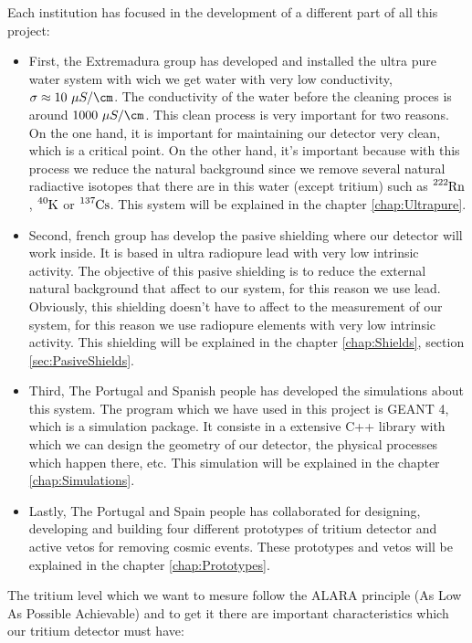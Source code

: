Each institution has focused in the development of a different part of all this project:
\begin{itemize}
\item{} First, the Extremadura group has developed and installed the ultra pure water system with wich we get water with very low conductivity, $\sigma \approx 10 ~\mu S / \cm$. The conductivity of the water before the cleaning proces is around $ 1000 ~\mu S / \cm$. This clean process is very important for two reasons. On the one hand, it is important for maintaining our detector very clean, which is a critical point. On the other hand, it's important because with this process we reduce the natural background since we remove several natural radiactive isotopes that there are in this water (except tritium) such as $\ce{^{222}Rn}$, $\ce{^{40}K}$ or $\ce{^{137}Cs}$. This system will be explained in the chapter \ref{chap:Ultrapure}.

\item{} Second, french group has develop the pasive shielding where our detector will work inside. It is based in ultra radiopure lead with very low intrinsic activity. The objective of this pasive shielding is to reduce the external natural background that affect to our system, for this reason we use lead. Obviously, this shielding doesn't have to affect to the measurement of our system, for this reason we use radiopure elements with very low intrinsic activity. This shielding will be explained in the chapter \ref{chap:Shields}, section \ref{sec:PasiveShields}.

\item{} Third, The Portugal and Spanish people has developed the simulations about this system. The program which we have used in this project is GEANT 4, which is a simulation package. It consiste in a extensive C++ library with which we can design the geometry of our detector, the physical processes which happen there, etc. This simulation will be explained in the chapter \ref{chap:Simulations}.

\item{} Lastly, The Portugal and Spain people has collaborated for designing, developing and building four different prototypes of tritium detector and active vetos for removing cosmic events. These prototypes and vetos will be explained in the chapter \ref{chap:Prototypes}.

\end{itemize}

The tritium level which we want to mesure follow the ALARA principle (As Low As Possible Achievable) and to get it there are important characteristics which our tritium detector must have:

